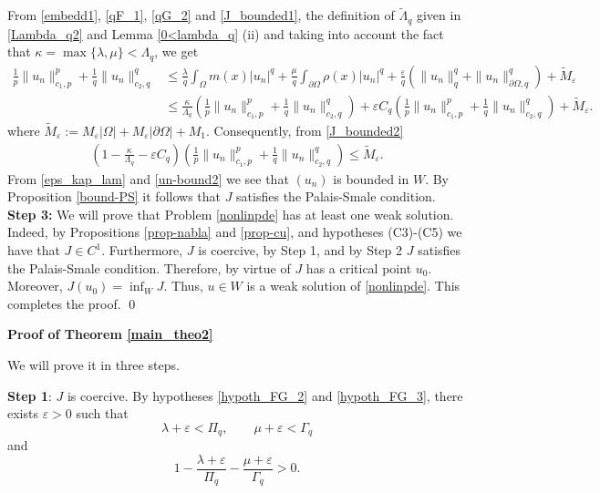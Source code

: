 \documentclass[pdflatex,sn-mathphys-num]{sn-jnl}
\theoremstyle{thmstyleone}%
\theoremstyle{thmstyletwo}%
\theoremstyle{thmstylethree}%
\theoremstyle{thmstylethree}%
\begin{document}
From  \eqref{embedd1}, \eqref{qF_1}, \eqref{qG_2}
and \eqref{J_bounded1}, the definition of $\tilde\Lambda_q$ given in \eqref{Lambda_q2} and Lemma \ref{0<lambda_q} (ii) and taking into account the fact that $\kappa=\max\{\lambda, \mu\} <\Lambda_q$, we get
\begin{equation}\label{J_bounded2}
\begin{aligned}
        \frac{1}{p}\|u_n\|_{c_1, p}^p+\frac{1}{q}\|u_n\|_{c_2, q}^q & \leqslant 
        \frac{\lambda}{q} \int_\Omega m(x)|u_n|^q +\frac{\mu}{q} \int_{\partial\Omega}  \rho(x)|u_n|^q + \frac{\varepsilon}{q}(\|u_n\|_q^q+\|u_n\|_{\partial\Omega,q}^q) +\tilde{M}_\varepsilon 
        \\
        &\leqslant \frac{\kappa}{\Lambda_q} \left(  \frac{1}{p}\|u_n\|_{c_1, p}^p+\frac{1}{q}\|u_n\|_{c_2, q}^q \right) +\varepsilon C_q\left(  \frac{1}{p}\|u_n\|_{c_1, p}^p+\frac{1}{q}\|u_n\|_{c_2, q}^q \right)+\tilde{M}_\varepsilon.
 \end{aligned}
\end{equation}
where $\tilde{M}_\varepsilon:=M_\varepsilon |\Omega| + M_\varepsilon |\partial\Omega|+M_1 $. Consequently, from \eqref{J_bounded2}
\begin{equation}\label{un-bound2}
    \begin{aligned}
        \left(1-\frac{\kappa}{\Lambda_q}-\varepsilon C_q\right)\left(  \frac{1}{p}\|u_n\|_{c_1, p}^p+\frac{1}{q}\|u_n\|_{c_2, q}^q \right)\leqslant \tilde{M}_\varepsilon.
    \end{aligned}
\end{equation}
From \eqref{eps_kap_lam} and \eqref{un-bound2} we see that $(u_n)$ is bounded in $W$. By Proposition \ref{bound-PS} it follows that $J$ satisfies the Palais-Smale condition.
\vskip0.2cm
\noindent
\textbf{Step 3:} We will prove that Problem \eqref{nonlinpde} has at least one weak solution.
Indeed, by Propositions \ref{prop-nabla} and \ref{prop-cu}, and hypotheses (C3)-(C5) we have that $J\in C^1$. Furthermore, $J$ is coercive, by Step 1, and by Step 2 $J$ satisfies the Palais-Smale condition. Therefore, by virtue of \cite[Theorem 2.7]{PR} $J$ has a critical point $u_0$. Moreover, $\displaystyle J(u_0)=\inf_W J$. Thus, $u\in W$  is a weak solution of \eqref{nonlinpde}. This completes the proof. \qed


\vskip0.4cm 
\noindent
{\bf Proof of Theorem  \ref{main_theo2}}\mbox{}

\noindent

We will prove it in three steps.

\noindent
\textbf{Step 1}:  $J$ is coercive. 
     By hypotheses \eqref{hypoth_FG_2} and \eqref{hypoth_FG_3}, there exists $\varepsilon >0$ such that 
    \begin{equation}\label{restric_2}
    \lambda +\varepsilon <\Pi_q, \qquad \mu +\varepsilon <\Gamma_q   
    \end{equation}
     and  \begin{equation}\label{restric_1}
        1-\frac{\lambda+\varepsilon}{{\Pi}_q}-\frac{\mu+\varepsilon}{{\Gamma}_q}>0.
    \end{equation}
\end{document}
